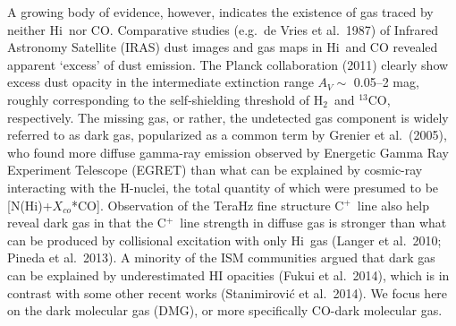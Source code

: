 \documentclass[preprint]{emulateapj}
\def\hi{H{\sc i}}
\def\s{s$^{-1}$}
\def\13co{$^{13}$CO}
\def\h2{H$_2$}
\def\cp{C$^+$}
\def\mic{$\mu$m}
\def\xco{$X_{co}$}
\begin{document}
 A growing body of evidence, however,  indicates the existence of gas traced by neither \hi\ nor CO.  Comparative studies (e.g.\ de Vries et al.\ 1987) of Infrared Astronomy Satellite (IRAS) dust images and gas maps in \hi\ and CO revealed apparent `excess' of dust emission. The Planck collaboration (2011) clearly show excess dust opacity  in the intermediate extinction range $A_V \sim$ 0.05--2 mag, roughly corresponding to the self-shielding threshold of \h2\ and \13co, respectively. The missing gas, or rather, the undetected gas component is widely referred to as dark gas, popularized as a common term by Grenier et al.\ (2005), who found more diffuse gamma-ray emission observed by Energetic Gamma Ray Experiment Telescope (EGRET) than what can be explained by cosmic-ray interacting with the H-nuclei, the total quantity of which were presumed to be [N(\hi)+\xco*CO]. Observation of the TeraHz fine structure \cp\ line also help reveal dark gas in that the \cp\ line strength in diffuse gas is stronger than what can be produced by collisional excitation with only \hi\ gas (Langer et al.\ 2010; Pineda et al.\ 2013). A minority of the ISM communities argued that dark gas can be explained by underestimated HI opacities (Fukui et al.\ 2014), which is in contrast with some other recent works (Stanimirovi{\'c} et al.\ 2014).  We focus here on the dark molecular gas (DMG), or more specifically CO-dark molecular gas.
\end{document}
